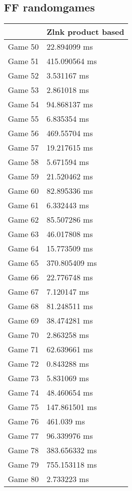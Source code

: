 \subsection{FF randomgames}
\begin{tabular}{|l|l|}
	\hline
	& Zlnk product based \\ \hline
	Game 50 & 22.894099 ms \\ \hline
	Game 51 & 415.090564 ms \\ \hline
	Game 52 & 3.531167 ms \\ \hline
	Game 53 & 2.861018 ms \\ \hline
	Game 54 & 94.868137 ms \\ \hline
	Game 55 & 6.835354 ms \\ \hline
	Game 56 & 469.55704 ms \\ \hline
	Game 57 & 19.217615 ms \\ \hline
	Game 58 & 5.671594 ms \\ \hline
	Game 59 & 21.520462 ms \\ \hline
	Game 60 & 82.895336 ms \\ \hline
	Game 61 & 6.332443 ms \\ \hline
	Game 62 & 85.507286 ms \\ \hline
	Game 63 & 46.017808 ms \\ \hline
	Game 64 & 15.773509 ms \\ \hline
	Game 65 & 370.805409 ms \\ \hline
	Game 66 & 22.776748 ms \\ \hline
	Game 67 & 7.120147 ms \\ \hline
	Game 68 & 81.248511 ms \\ \hline
	Game 69 & 38.474281 ms \\ \hline
	Game 70 & 2.863258 ms \\ \hline
	Game 71 & 62.639661 ms \\ \hline
	Game 72 & 0.843288 ms \\ \hline
	Game 73 & 5.831069 ms \\ \hline
	Game 74 & 48.460654 ms \\ \hline
	Game 75 & 147.861501 ms \\ \hline
	Game 76 & 461.039 ms \\ \hline
	Game 77 & 96.339976 ms \\ \hline
	Game 78 & 383.656332 ms \\ \hline
	Game 79 & 755.153118 ms \\ \hline
	Game 80 & 2.733223 ms \\ \hline

\end{tabular}
